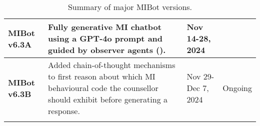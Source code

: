\begin{table}[!h]
\begin{tabular}{
		@{}m{}
		m{}
		m{}
		m{}@{}}
		\hline
		\textbf{MIBot v6.3A} &
		Fully generative MI chatbot using a GPT-4o prompt and guided by observer agents (\Cref{ch:mibot}).
		                     & Nov 14-28, 2024                                                                                                                                                                                & \citet{mahmood-etal-2025-fully}                            \\
		\hline
		\textbf{MIBot v6.3B} & Added chain-of-thought mechanisms to first reason about which MI behavioural code the counsellor should exhibit before generating a response.                                                  & Nov 29-Dec 7, 2024              & Ongoing                  \\
		\arrayrulecolor{black}
		\bottomrule
	\end{tabular}
	\caption[Summary of major MIBot versions]{Summary of major MIBot versions.}
\end{table}